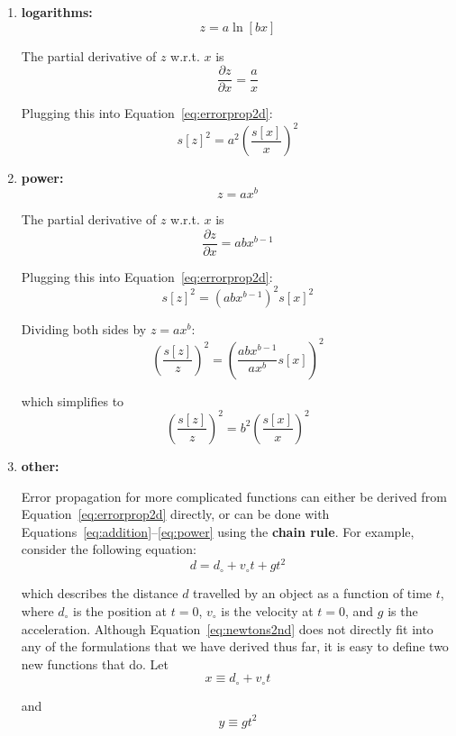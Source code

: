 \begin{enumerate}
\item{\bf logarithms:}
  \[
  z = a \ln[bx]
  \]

  The partial derivative of $z$ w.r.t. $x$ is
  \[
  \frac{\partial z}{\partial x} = \frac{a}{x}
  \]

  Plugging this into Equation~\ref{eq:errorprop2d}:
  \begin{equation}
    s[z]^2 = a^2 \left(\frac{s[x]}{x}\right)^2
    \label{eq:logarithms}
  \end{equation}

\item{\bf power:}
  \[
  z = a x^b
  \]

  The partial derivative of $z$ w.r.t. $x$ is
  \[
  \frac{\partial z}{\partial x} = ab x^{b-1}
  \]

  Plugging this into Equation~\ref{eq:errorprop2d}:
  \[
  s[z]^2 = \left(ab x^{b-1}\right)^2 s[x]^2
  \]

  Dividing both sides by $z = a x^b$:
  \[
  \left(\frac{s[z]}{z}\right)^2 = \left(\frac{ab x^{b-1}}{a x^{b}}s[x]\right)^2 
  \]

  which simplifies to
  \begin{equation}
    \left(\frac{s[z]}{z}\right)^2 = b^2\left(\frac{s[x]}{x}\right)^2
    \label{eq:power}
  \end{equation}

\item{\bf other:}

  Error propagation for more complicated functions can either be derived
  from Equation~\ref{eq:errorprop2d} directly, or can be done with
  Equations~\ref{eq:addition}--\ref{eq:power} using the \textbf{chain
    rule}. For example, consider the following equation:
  \begin{equation}
    d = d_\circ + v_\circ t + g t^2
    \label{eq:newtons2nd}
  \end{equation}

  \noindent which describes the distance $d$ travelled by an object as a
  function of time $t$, where $d_\circ$ is the position at $t=0$,
  $v_\circ$ is the velocity at $t=0$, and $g$ is the acceleration.
  Although Equation~\ref{eq:newtons2nd} does not directly fit into any
  of the formulations that we have derived thus far, it is easy to
  define two new functions that do. Let
  \begin{equation}
    x \equiv d_\circ + v_\circ t
    \label{eq:xvt}
  \end{equation}

  \noindent and
  \begin{equation}
    y \equiv g t^2
    \label{eq:ygt2}
  \end{equation}


\end{enumerate}
